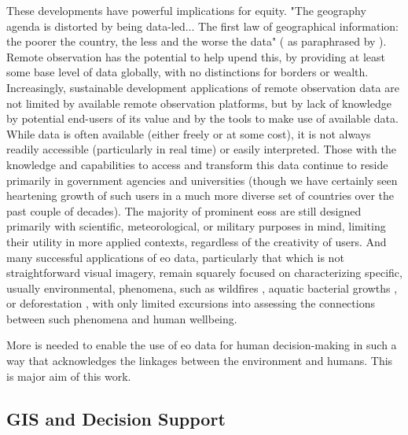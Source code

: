 \documentclass[notitlepage]{article}
\begin{document}
These developments have powerful implications for equity. "The geography agenda is distorted by being data-led... The first law of geographical information: the poorer the country, the less and the worse the data"  (\cite{overton1991further} as paraphrased by \cite{taylorGeographicInformationSystems1994}). Remote observation has the potential to help upend this, by providing at least some base level of data globally, with no distinctions for borders or wealth. Increasingly, sustainable development applications of remote observation data are not limited by available remote observation platforms, but by lack of knowledge by potential end-users of its value and by the tools to make use of available data. While data is often available (either freely or at some cost), it is not always readily accessible (particularly in real time) or easily interpreted. Those with the knowledge and capabilities to access and transform this data continue to reside primarily in government agencies and universities (though we have certainly seen heartening growth of such users in a much more diverse set of countries over the past couple of decades). The majority of prominent \acp{eos} are still designed primarily with scientific, meteorological, or military purposes in mind, limiting their utility in more applied contexts, regardless of the creativity of users. And many successful applications of \ac{eo} data, particularly that which is not straightforward visual imagery, remain squarely focused on characterizing specific, usually environmental, phenomena, such as wildfires \cite{schroederNewVIIRS375m2014},  aquatic bacterial growths \cite{stromingQuantifyingHumanHealth2020}, or deforestation \cite{lagomasinoMeasuringMangroveCarbon2019}, with only limited excursions into assessing the connections between such phenomena and human wellbeing.

More is needed to enable the use of \ac{eo} data for human decision-making in such a way that acknowledges the linkages between the environment and humans. This is major aim of this work. 


\subsection{GIS and Decision Support} \label{sec:gis}
\end{document}
